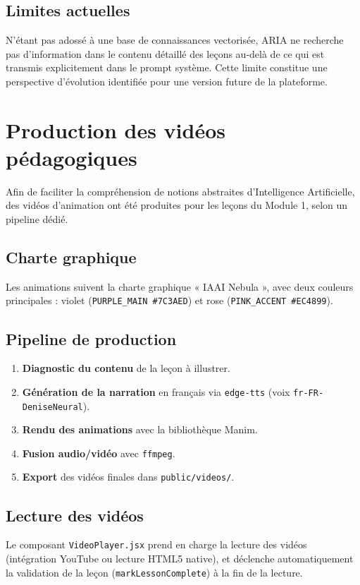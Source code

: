 \documentclass[12pt, a4paper]{report}
\begin{document}
\subsection{Limites actuelles}
N'étant pas adossé à une base de connaissances vectorisée, ARIA ne recherche pas d'information dans le contenu détaillé des leçons au-delà de ce qui est transmis explicitement dans le prompt système. Cette limite constitue une perspective d'évolution identifiée pour une version future de la plateforme.

\section{Production des vidéos pédagogiques}
Afin de faciliter la compréhension de notions abstraites d'Intelligence Artificielle, des vidéos d'animation ont été produites pour les leçons du Module 1, selon un pipeline dédié.

\subsection{Charte graphique}
Les animations suivent la charte graphique « IAAI Nebula », avec deux couleurs principales : violet (\texttt{PURPLE\_MAIN \#7C3AED}) et rose (\texttt{PINK\_ACCENT \#EC4899}).

\subsection{Pipeline de production}
\begin{enumerate}
    \item \textbf{Diagnostic du contenu} de la leçon à illustrer.
    \item \textbf{Génération de la narration} en français via \texttt{edge-tts} (voix \texttt{fr-FR-DeniseNeural}).
    \item \textbf{Rendu des animations} avec la bibliothèque Manim.
    \item \textbf{Fusion audio/vidéo} avec \texttt{ffmpeg}.
    \item \textbf{Export} des vidéos finales dans \texttt{public/videos/}.
\end{enumerate}

\subsection{Lecture des vidéos}
Le composant \texttt{VideoPlayer.jsx} prend en charge la lecture des vidéos (intégration YouTube ou lecture HTML5 native), et déclenche automatiquement la validation de la leçon (\texttt{markLessonComplete}) à la fin de la lecture.
\end{document}

